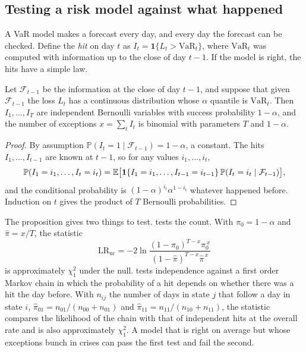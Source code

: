 \begin{chapterrefs}
\FloatBarrier
\section{Testing a risk model against what happened}
\label{sec8:backtest}

A VaR model makes a forecast every day, and every day the forecast can be checked. Define the
\emph{hit} on day $t$ as $I_t=\mathbf 1\{L_t>\mathrm{VaR}_t\}$, where $\mathrm{VaR}_t$ was computed
with information up to the close of day $t-1$. If the model is right, the hits have a simple law.

\begin{proposition}\label{prop8:hits}
Let $\mathcal F_{t-1}$ be the information at the close of day $t-1$, and suppose that given
$\mathcal F_{t-1}$ the loss $L_t$ has a continuous distribution whose $\alpha$ quantile is
$\mathrm{VaR}_t$. Then $I_1,\dots,I_T$ are independent Bernoulli variables with success probability
$1-\alpha$, and the number of exceptions $x=\sum_t I_t$ is binomial with parameters $T$ and $1-\alpha$.
\end{proposition}
\begin{proof}
By assumption $\mathbb P(I_t=1\mid\mathcal F_{t-1})=1-\alpha$, a constant. The hits $I_1,\dots,I_{t-1}$ are
known at $t-1$, so for any values $i_1,\dots,i_t$,
\[
  \mathbb P(I_1=i_1,\dots,I_t=i_t)=\mathbb{E}\bigl[\mathbf 1\{I_1=i_1,\dots,I_{t-1}=i_{t-1}\}\,
  \mathbb P(I_t=i_t\mid\mathcal F_{t-1})\bigr],
\]
and the conditional probability is $(1-\alpha)^{i_t}\alpha^{1-i_t}$ whatever happened before. Induction
on $t$ gives the product of $T$ Bernoulli probabilities.
\end{proof}

The proposition gives two things to test. \textcite{kupiec1995} tests the count. With
$\pi_0=1-\alpha$ and $\hat\pi=x/T$, the statistic
\begin{equation}\label{eq8:kupiec}
  \mathrm{LR}_{\mathrm{uc}}=-2\ln\frac{(1-\pi_0)^{T-x}\pi_0^{\,x}}{(1-\hat\pi)^{T-x}\hat\pi^{\,x}}
\end{equation}
is approximately $\chi^2_1$ under the null. \textcite{christoffersen1998} tests independence against a
first order Markov chain in which the probability of a hit depends on whether there was a hit the day
before. With $n_{ij}$ the number of days in state $j$ that follow a day in state $i$,
$\hat\pi_{01}=n_{01}/(n_{00}+n_{01})$ and $\hat\pi_{11}=n_{11}/(n_{10}+n_{11})$, the statistic
compares the likelihood of the chain with that of independent hits at the overall rate and is also
approximately $\chi^2_1$. A model that is right on average but whose exceptions bunch in crises can
pass the first test and fail the second.


\end{chapterrefs}
